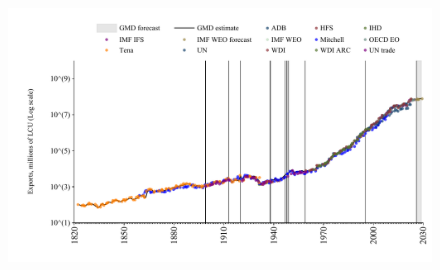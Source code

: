 \documentclass[12pt,a4paper,landscape]{article}
\begin{document}
\begin{adjustbox}{max totalsize={\paperwidth}{\paperheight},center}
\begin{minipage}[t][\textheight][t]{\textwidth}
\begin{figure}[H]
\includegraphics[width=\textwidth,height=0.6\textheight,keepaspectratio]{graphs/IND_exports.pdf}
\end{figure}
\end{minipage}
\end{adjustbox}
\end{document}
